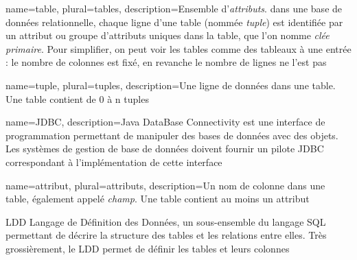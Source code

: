         {name={table},
        plural={tables},
        description={Ensemble d'\textit{attributs}.
        dans une base de données relationnelle, chaque ligne d'une table (nommée \textit{tuple}) est identifiée
        par un attribut ou groupe d'attributs
        uniques dans la table, que l'on nomme \textit{clée primaire}.
        Pour simplifier, on peut voir les tables comme des tableaux à une entrée : le nombre de colonnes est fixé, en revanche le nombre de lignes ne l'est pas}}

        {name={tuple},
        plural={tuples},
        description={Une ligne de données dans une table. Une table contient de 0 à n tuples}}
        
        
{
  name=JDBC,
  description={Java DataBase Connectivity est une interface de programmation permettant de manipuler des bases de données avec des objets. Les systèmes de gestion de base de données doivent fournir un pilote JDBC correspondant à l'implémentation de cette interface}
}


        {name={attribut},
        plural={attributs},
        description={Un nom de colonne dans une table, également appelé \textit{champ}.
        Une table contient au moins un attribut}}
        


        
        

        {LDD}
        {Langage de Définition des Données, un sous-ensemble du langage SQL permettant de décrire la structure des tables et les relations entre elles. Très grossièrement, le LDD permet de définir les tables et leurs colonnes}

